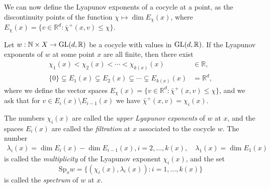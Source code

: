 \documentclass{report}
\begin{document}
We can now define the Lyapunov exponents of a cocycle at a point, as the discontinuity points of the function $\chi \mapsto \dim E_\chi(x)$, where $E_\chi(x) = \{v \in \mathbb R^d: \bar \chi^+(x,v) \leq \chi\}$.
\begin{definition}
    Let $w: \mathbb N \times X \to \operatorname{{\mathrm{GL}}}(d, \mathbb R)$ be a cocycle with values in $\operatorname{{\mathrm{GL}}}(d,\mathbb R)$.
    If the Lyapunov exponents of $w$ at some point $x$ are all finite, then there exist
    \begin{align*}
        \chi_1(x) < \chi_2(x) < \cdots < \chi_{k(x)}(x) &\in \mathbb R,\\
        \{0 \} \subsetneq E_1(x) \subsetneq E_2(x) \subsetneq \cdots \subsetneq E_{k(x)}(x) &= \mathbb R^d,
    \end{align*}
    where we define the vector spaces $E_\chi(x) = \{v \in \mathbb R^d: \bar \chi^+(x,v) \leq \chi\}$, and we ask that for $v \in E_i(x) \setminus E_{i-1}(x)$ we have $\bar \chi^+(x,v) = \chi_i(x)$.

    The numbers $\chi_i(x)$ are called the \emph{upper Lyapunov exponents} of $w$ at $x$, and the spaces $E_i(x)$ are called the \emph{filtration} at $x$ associated to the cocycle $w$.
    The number 
    \begin{align*}
        \lambda_i(x) = \dim E_i(x) - \dim E_{i-1}(x), i = 2, \ldots, k(x), \quad \lambda_1(x) = \dim E_1(x)
    \end{align*}
    is called the \emph{multiplicity} of the Lyapunov exponent $\chi_i(x)$, and the set
    \[
    \mathrm{Sp}_x w = \{(\chi_i(x), \lambda_i(x)): i = 1, \ldots, k(x)\}
    \]
    is called the \emph{spectrum} of $w$ at $x$.
\end{definition}
\end{document}
